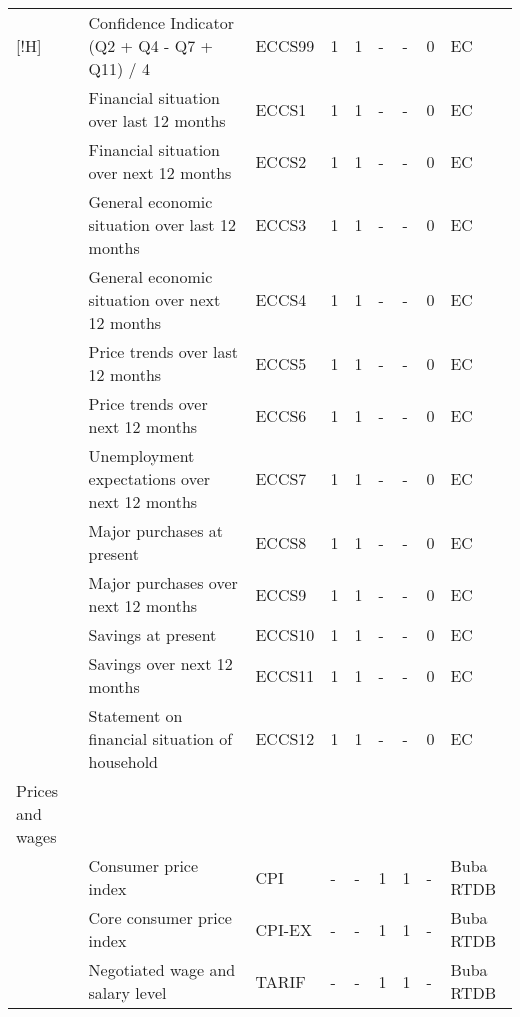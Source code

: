 \documentclass[10pt]{article}
\begin{document}
\begin{footnotesize}
\begin{longtable}{p{1.1in}|p{2.5in}|p{1in}|p{.1in}|p{.1in}|p{.1in}|p{.15in}|p{.1in}|p{.5in}}[!H]
 & {\tiny{}Confidence Indicator (Q2 + Q4 - Q7 + Q11) / 4 } & {\tiny{}ECCS99} & {\tiny{}1} & {\tiny{}1} & {\tiny{}-} & {\tiny{}-} & {\tiny{}0} & {\tiny{}EC}\tabularnewline
 & {\tiny{}Financial situation over last 12 months} & {\tiny{}ECCS1} & {\tiny{}1} & {\tiny{}1} & {\tiny{}-} & {\tiny{}-} & {\tiny{}0} & {\tiny{}EC}\tabularnewline
 & {\tiny{}Financial situation over next 12 months} & {\tiny{}ECCS2} & {\tiny{}1} & {\tiny{}1} & {\tiny{}-} & {\tiny{}-} & {\tiny{}0} & {\tiny{}EC}\tabularnewline
 & {\tiny{}General economic situation over last 12 months} & {\tiny{}ECCS3} & {\tiny{}1} & {\tiny{}1} & {\tiny{}-} & {\tiny{}-} & {\tiny{}0} & {\tiny{}EC}\tabularnewline
 & {\tiny{}General economic situation over next 12 months} & {\tiny{}ECCS4} & {\tiny{}1} & {\tiny{}1} & {\tiny{}-} & {\tiny{}-} & {\tiny{}0} & {\tiny{}EC}\tabularnewline
 & {\tiny{}Price trends over last 12 months} & {\tiny{}ECCS5} & {\tiny{}1} & {\tiny{}1} & {\tiny{}-} & {\tiny{}-} & {\tiny{}0} & {\tiny{}EC}\tabularnewline
 & {\tiny{}Price trends over next 12 months} & {\tiny{}ECCS6} & {\tiny{}1} & {\tiny{}1} & {\tiny{}-} & {\tiny{}-} & {\tiny{}0} & {\tiny{}EC}\tabularnewline
 & {\tiny{}Unemployment expectations over next 12 months} & {\tiny{}ECCS7} & {\tiny{}1} & {\tiny{}1} & {\tiny{}-} & {\tiny{}-} & {\tiny{}0} & {\tiny{}EC}\tabularnewline
 & {\tiny{}Major purchases at present} & {\tiny{}ECCS8} & {\tiny{}1} & {\tiny{}1} & {\tiny{}-} & {\tiny{}-} & {\tiny{}0} & {\tiny{}EC}\tabularnewline
 & {\tiny{}Major purchases over next 12 months} & {\tiny{}ECCS9} & {\tiny{}1} & {\tiny{}1} & {\tiny{}-} & {\tiny{}-} & {\tiny{}0} & {\tiny{}EC}\tabularnewline
 & {\tiny{}Savings at present} & {\tiny{}ECCS10} & {\tiny{}1} & {\tiny{}1} & {\tiny{}-} & {\tiny{}-} & {\tiny{}0} & {\tiny{}EC}\tabularnewline
 & {\tiny{}Savings over next 12 months} & {\tiny{}ECCS11} & {\tiny{}1} & {\tiny{}1} & {\tiny{}-} & {\tiny{}-} & {\tiny{}0} & {\tiny{}EC}\tabularnewline
 & {\tiny{}Statement on financial situation of household} & {\tiny{}ECCS12} & {\tiny{}1} & {\tiny{}1} & {\tiny{}-} & {\tiny{}-} & {\tiny{}0} & {\tiny{}EC}\tabularnewline
{\tiny{}Prices and wages} &  &  &  &  &  &  &  & \tabularnewline
 & {\tiny{}Consumer price index} & {\tiny{}CPI} & {\tiny{}-} & {\tiny{}-} & {\tiny{}1} & {\tiny{}1} & {\tiny{}-} & {\tiny{}Buba RTDB}\tabularnewline
 & {\tiny{}Core consumer price index} & {\tiny{}CPI-EX} & {\tiny{}-} & {\tiny{}-} & {\tiny{}1} & {\tiny{}1} & {\tiny{}-} & {\tiny{}Buba RTDB}\tabularnewline
 & {\tiny{}Negotiated wage and salary level} & {\tiny{}TARIF} & {\tiny{}-} & {\tiny{}-} & {\tiny{}1} & {\tiny{}1} & {\tiny{}-} & {\tiny{}Buba RTDB}\tabularnewline

\end{longtable}
\end{footnotesize}
\end{document}
